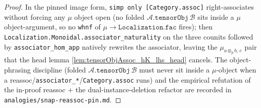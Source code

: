 \begin{proof}
  In the pinned image form, \texttt{simp only [Category.assoc]} right-associates without forcing any
  \(\mu\) object open (no folded \(\mathcal A.\texttt{tensorObj}\,\mathcal B\) sits inside a \(\mu\)
  object-argument, so no \texttt{whnf} of \(\mu\to\texttt{Localization.fac}\) fires); then
  \texttt{Localization.Monoidal.associator\_naturality} on the three counits followed by
  \texttt{associator\_hom\_app} natively rewrites the associator, leaving the \(\mu_{a\otimes_p b,\,c}\)
  pair that the head lemma \cref{lem:tensorObjAssoc_hK_lhs_head} cancels. The object-phrasing discipline
  (folded \(\mathcal A.\texttt{tensorObj}\,\mathcal B\) must never sit inside a \(\mu\)-object when a
  reassoc/\texttt{associator\_*}/\texttt{Category.assoc} runs) and the empirical refutation of the
  in-proof reassoc + the dual-instance-deletion refactor are recorded in
  \texttt{analogies/snap-reassoc-pin.md}.

\end{proof}
